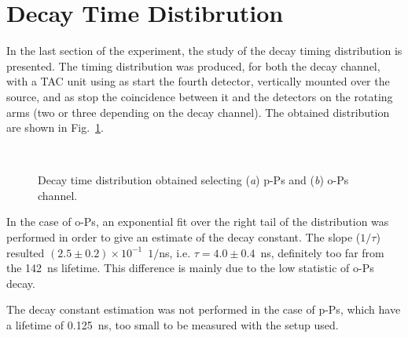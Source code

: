 \section*{Decay Time Distibrution}
In the last section of the experiment, the study of the decay timing distribution is presented.
The timing distribution was produced, for both the decay channel, with a TAC unit using as start the  fourth detector, vertically mounted over the source, and as stop the coincidence between it and the detectors on the rotating arms (two or three depending on the decay channel). 
The obtained distribution are shown in Fig.~\ref{Fig:DecayDist}.

\begin{figure}[H]
	\centering
	 \quad
		 \\
	\caption{Decay time distribution obtained selecting (\emph{a}) p-Ps and (\emph{b}) o-Ps channel. }
    \label{Fig:DecayDist}
\end{figure}

In the case of o-Ps, an exponential fit over the right tail of the distribution was performed in order to give an estimate of the decay constant. The slope ($1/\tau$) resulted $(2.5 \pm0.2)\times 10^{-1}$~$1/$ns, i.e. $\tau = 4.0\pm0.4$~ns, definitely too far from the 142~ns lifetime. This difference is mainly due to the low statistic of o-Ps decay.

The decay constant estimation was not performed in the case of p-Ps, which have a lifetime of  0.125~ns, too small to be measured with the setup used.
